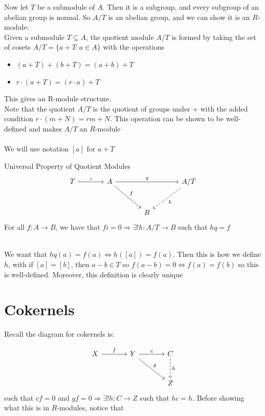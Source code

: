 \documentclass{report}
\begin{document}
Now let $T$ be a submodule of $A$. Then it is a subgroup, and every subgroup of an abelian group is normal. So $A/T$ is an abelian group, and we can show it is an $R$-module: \\
Given a submodule $T \subseteq A$, the quotient module $A/T$ is formed by taking the set of cosets $A/T=\{a+T:a\in A\}$ with the operations
\begin{itemize}
    \item $(a+T)+(b+T)=(a+b)+T$ 
    \item $r \cdot (a+T)=(r\cdot a)+T$
\end{itemize}
This gives an R-module structure. \\ Note that the quotient $A/T$ is the quotient of groups under $+$ with the added condition $r\cdot (m+N)=rm+N$. This operation can be shown to be well-defined and makes $A/T$ an $R$-module
\\ ~\\ We will use notation $[a]$ for $a + T$

\begin{thm}{Universal Property of Quotient Modules}{}\\
    \[
\begin{tikzcd}[row sep=large, column sep=large]
T \arrow[r, hook, "i"] & A \arrow[rr, "q"] \arrow[dr, "f"] & & A/T \arrow[dl, dashed, "h"] \\ & & B
\end{tikzcd}
\]
For all $f: A \to B$, we have that $fi=0 \Rightarrow \exists !h:A/T \to B$ such that $hq=f$
\end{thm}

\begin{prf}{}{}\\
We want that $hq(a)=f(a) \iff h([a])=f(a)$. Then this is how we define $h$, with if $[a]=[b]$, then $a-b \in T$ so $f(a-b)=0 \iff f(a)=f(b)$ so this is well-defined. Moreover, this definition is clearly unique
    
\end{prf}

\section{Cokernels}
Recall the diagram for cokernels is:

    \[
\begin{tikzcd}[row sep=large, column sep=large]
X \arrow[r, "f"] & Y \arrow[r, "c"] \arrow[dr, "g"] & C \arrow[d, dashed, "h"] \\ & & Z
\end{tikzcd}
\]
such that $cf=0$ and $gf=0 \Rightarrow \exists  !h:C\to Z$ such that $hc=h$. Before showing what this is in $R$-modules, notice that
\end{document}

